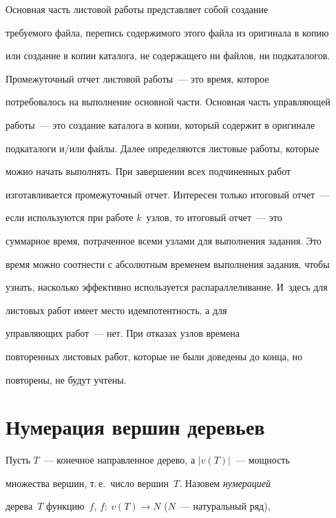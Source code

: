      


      Основная часть листовой работы представляет собой создание 


требуемого файла, перепись содержимого этого файла из оригинала в копию 


или создание в копии каталога, не содержащего ни файлов, ни подкаталогов. 


Промежуточный отчет листовой работы~--- это время, которое 


потребовалось на выполнение основной части. Основная часть управляющей 


работы~--- это создание каталога в копии, который содержит в оригинале 


подкаталоги и/\!или файлы. Далее определяются листовые работы, которые 


можно начать выполнять. При завершении всех подчиненных работ 


изготавливается промежуточный отчет. Интересен только итоговый отчет~--- 


если используются при работе $k$~узлов,  то итоговый отчет~--- это 


суммарное время, потраченное всеми узлами для выполнения задания. Это 


время можно соотнести с абсолютным временем выполнения задания, чтобы 


узнать, насколько эффективно используется распараллеливание. И~здесь для 


листовых работ имеет место идемпотентность, а для 


      управ\-ля\-ющих работ~--- нет. При отказах узлов времена 


повторенных листовых работ, которые не были доведены до конца, но 


повторены, не будут учтены.    





\section{Нумерация вершин деревьев}





      Пусть $T$~--- конечное направленное дерево,  а $|v(T)|$~--- мощность 


множества вершин, т.\,е.\ число вершин~$T$. Назовем \textit{нумерацией} 


дерева~$T$ функцию~$f$, $f:\ v(T)\rightarrow N$ ($N$~--- натуральный ряд), 


